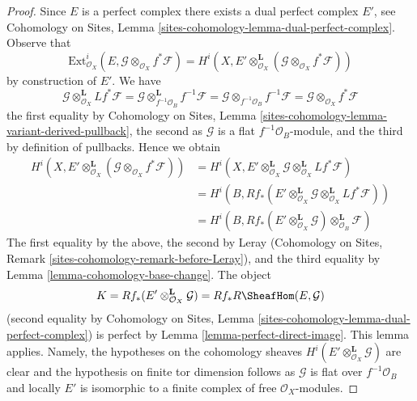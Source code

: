 \begin{proof}
Since $E$ is a perfect complex there exists a dual perfect complex
$E'$, see
Cohomology on Sites, Lemma \ref{sites-cohomology-lemma-dual-perfect-complex}.
Observe that
$$
\text{Ext}^i_{\mathcal{O}_X}(E,
\mathcal{G} \otimes_{\mathcal{O}_X} f^*\mathcal{F})
=
H^i(X, E' \otimes^\mathbf{L}_{\mathcal{O}_X}
(\mathcal{G} \otimes_{\mathcal{O}_X} f^*\mathcal{F}))
$$
by construction of $E'$. We have
$$
\mathcal{G} \otimes_{\mathcal{O}_X}^\mathbf{L} Lf^*\mathcal{F} =
\mathcal{G} \otimes_{f^{-1}\mathcal{O}_B}^\mathbf{L} f^{-1}\mathcal{F} =
\mathcal{G} \otimes_{f^{-1}\mathcal{O}_B} f^{-1}\mathcal{F} =
\mathcal{G} \otimes_{\mathcal{O}_X} f^*\mathcal{F}
$$
the first equality by
Cohomology on Sites, Lemma
\ref{sites-cohomology-lemma-variant-derived-pullback},
the second as $\mathcal{G}$ is a flat $f^{-1}\mathcal{O}_B$-module, and
the third by definition of pullbacks. Hence we obtain
\begin{align*}
H^i(X, E' \otimes^\mathbf{L}_{\mathcal{O}_X}
(\mathcal{G} \otimes_{\mathcal{O}_X} f^*\mathcal{F}))
& =
H^i(X, E' \otimes^\mathbf{L}_{\mathcal{O}_X} \mathcal{G}
\otimes_{\mathcal{O}_X}^\mathbf{L} Lf^*\mathcal{F}) \\
& =
H^i(B,
Rf_*(E' \otimes^\mathbf{L}_{\mathcal{O}_X} \mathcal{G}
\otimes^\mathbf{L}_{\mathcal{O}_X} Lf^*\mathcal{F})) \\
& =
H^i(B,
Rf_*(E' \otimes^\mathbf{L}_{\mathcal{O}_X} \mathcal{G})
\otimes^\mathbf{L}_{\mathcal{O}_B} \mathcal{F})
\end{align*}
The first equality by the above, the second by Leray
(Cohomology on Sites, Remark \ref{sites-cohomology-remark-before-Leray}), and
the third equality by Lemma \ref{lemma-cohomology-base-change}.
The object
$$
K = Rf_*(E' \otimes^\mathbf{L}_{\mathcal{O}_X} \mathcal{G}) =
Rf_*R\SheafHom(E, \mathcal{G})
$$
(second equality by
Cohomology on Sites, Lemma \ref{sites-cohomology-lemma-dual-perfect-complex})
is perfect by Lemma \ref{lemma-perfect-direct-image}.
This lemma applies. Namely, the hypotheses on the cohomology sheaves
$H^i(E' \otimes^\mathbf{L}_{\mathcal{O}_X} \mathcal{G})$
are clear and the hypothesis on finite tor dimension follows as $\mathcal{G}$
is flat over $f^{-1}\mathcal{O}_B$ and locally $E'$ is isomorphic
to a finite complex of free $\mathcal{O}_X$-modules.


\end{proof}

